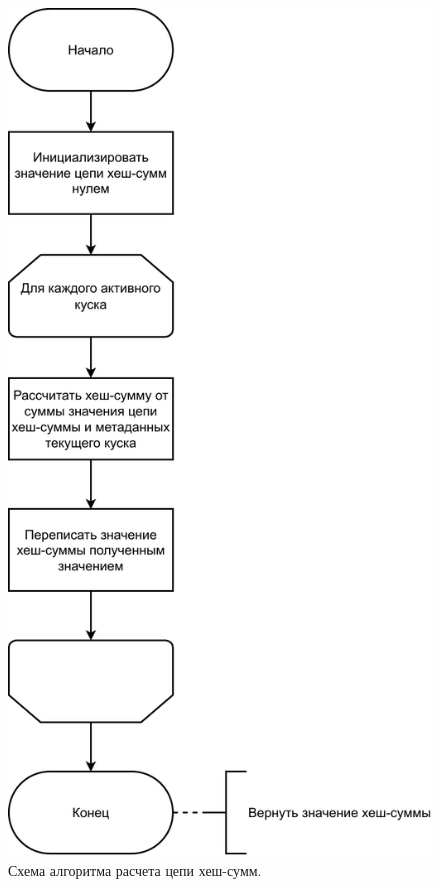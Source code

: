 \begin{figure}[hbtp]
	\centering
	\includegraphics[scale=0.7]{img/recalcalgo.pdf}
	\caption{Схема алгоритма расчета цепи хеш-сумм.}
	\label{fig:recalcalgo}
\end{figure}

